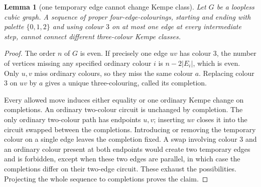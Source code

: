 \documentclass[11pt,a4paper]{article}
\newtheorem{lemma}[theorem]{Lemma}
\theoremstyle{definition}
\theoremstyle{remark}
\begin{document}
\begin{lemma}[one temporary edge cannot change Kempe class]\label{lem:one-buffer}
Let $G$ be a loopless cubic graph.  A sequence of proper four-edge-colourings, starting and ending with palette $\{0,1,2\}$ and using colour $3$ on at most one edge at every intermediate step, cannot connect different three-colour Kempe classes.
\end{lemma}
\begin{proof}
The order $n$ of $G$ is even.  If precisely one edge $uv$ has colour $3$, the number of vertices missing any specified ordinary colour $i$ is $n-2|E_i|$, which is even.  Only $u,v$ miss ordinary colours, so they miss the same colour $a$.  Replacing colour $3$ on $uv$ by $a$ gives a unique three-colouring, called its completion.

Every allowed move induces either equality or one ordinary Kempe change on completions.  An ordinary two-colour circuit is unchanged by completion.  The only ordinary two-colour path has endpoints $u,v$; inserting $uv$ closes it into the circuit swapped between the completions.  Introducing or removing the temporary colour on a single edge leaves the completion fixed.  A swap involving colour $3$ and an ordinary colour present at both endpoints would create two temporary edges and is forbidden, except when these two edges are parallel, in which case the completions differ on their two-edge circuit.  These exhaust the possibilities.  Projecting the whole sequence to completions proves the claim.
\end{proof}
\end{document}
